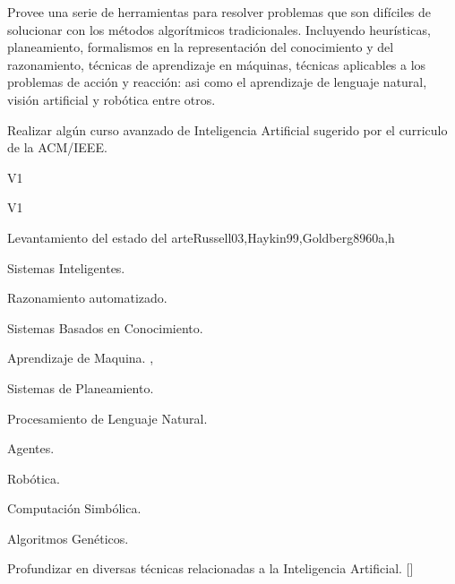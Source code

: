\begin{syllabus}


\begin{justification}
Provee una serie de herramientas para resolver problemas que son difíciles de solucionar con los métodos algorítmicos tradicionales. Incluyendo heurísticas, planeamiento, formalismos en la representación del conocimiento y del razonamiento, técnicas de aprendizaje en máquinas, técnicas aplicables a los problemas de acción y reacción: asi como el aprendizaje de lenguaje natural, visión artificial y robótica entre otros. 
\end{justification}

\begin{goals}
\item Realizar algún curso avanzado de Inteligencia Artificial sugerido por el curriculo de la ACM/IEEE.
\end{goals}

\begin{outcomes}{V1}
\item {}
\item {}
\item {}
\item {}
\end{outcomes}

\begin{competences}{V1}
\item {} 
\item {} 
\item {}
\end{competences}

\begin{unit}{}{Levantamiento del estado del arte}{Russell03,Haykin99,Goldberg89}{60}{a,h}
\begin{topics}
  \item Sistemas Inteligentes.
  \item Razonamiento automatizado.
  \item Sistemas Basados en Conocimiento.
  \item Aprendizaje de Maquina. \cite{Russell03},\cite{Haykin99}
  \item Sistemas de Planeamiento.
  \item Procesamiento de Lenguaje Natural.
  \item Agentes.
  \item Robótica.
  \item Computación Simbólica.
  \item Algoritmos Genéticos. \cite{Goldberg89}
\end{topics}
\begin{learningoutcomes}
  \item Profundizar en diversas técnicas relacionadas a la Inteligencia Artificial. [\Usage]
\end{learningoutcomes}
\end{unit}


\end{syllabus}
